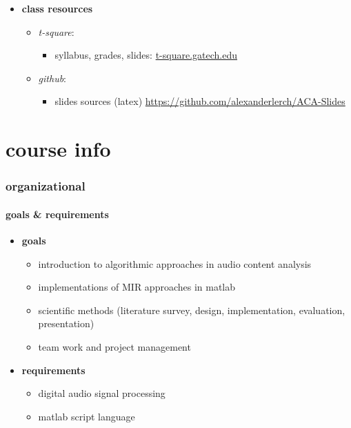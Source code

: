 \begin{frame}
\begin{itemize}
                \smallskip
                \item<3-> \textbf{class resources}
                    \begin{itemize}
                        \item	\textit{t-square}:
                            \begin{itemize}
                                \item   syllabus, grades, slides: \url{t-square.gatech.edu}
                            \end{itemize}
                        \item	\textit{github}:
                            \begin{itemize}
                                \item   slides sources (latex) \url{https://github.com/alexanderlerch/ACA-Slides}
                            \end{itemize}
                    \end{itemize}
            \end{itemize}
        \end{frame}

    \section{course info}
        \begin{frame}\frametitle{organizational}\framesubtitle{goals \& requirements}
            \begin{itemize}
                \item	\textbf{goals}
                        \begin{itemize}
                            \item	introduction to algorithmic approaches in audio content analysis
                            \item	implementations of MIR approaches in matlab
                            \item	scientific methods (literature survey, design, implementation, evaluation, presentation)
                            \item	team work and project management
                        \end{itemize}

                \smallskip
                \item<2-> \textbf{requirements}	
                        \begin{itemize}
                            \item	digital audio signal processing
                            \item	matlab script language
                        \end{itemize}
            \end{itemize}
        \end{frame}

